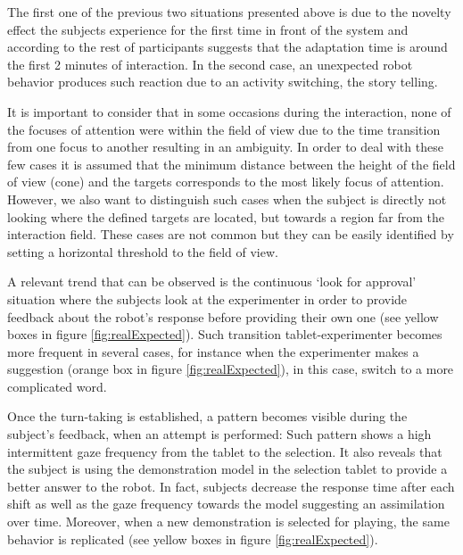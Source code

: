 \documentclass{sig-alternate}
\begin{document}
The first one of the previous two situations presented above is due to the
novelty effect the subjects experience for the first time in front of the system
and according to the rest of participants suggests that the adaptation time is
around the first 2 minutes of interaction. In the second case, an unexpected
robot behavior produces such reaction due to an activity switching, the story
telling.

It is important to consider that in some occasions during the interaction, none
of the focuses of attention were within the field of view due to the time
transition from one focus to another resulting in an ambiguity. In order to deal
with these few cases it is assumed that the minimum distance between the height
of the field of view (cone) and the targets corresponds to the most likely focus
of attention. However, we also want to distinguish such cases when the subject
is directly not looking where the defined targets are located, but towards a
region far from the interaction field. These cases are not common but they can
be easily identified by setting a horizontal threshold to the field of view.

A relevant trend that can be observed is the continuous `look for approval'
situation where the subjects look at the experimenter in order to provide
feedback about the robot's response before providing their own one (see yellow
boxes in figure \ref{fig:realExpected}). Such transition tablet-experimenter
becomes more frequent in several cases, for instance when the experimenter makes
a suggestion (orange box in figure \ref{fig:realExpected}), in this case, switch
to a more complicated word.

Once the turn-taking is established, a pattern becomes visible during the
subject's feedback, when an attempt is performed: Such pattern shows a high
intermittent gaze frequency from the tablet to the selection. It also reveals
that the subject is using the demonstration model in the selection tablet to
provide a better answer to the robot. In fact, subjects decrease the response
time after each shift as well as the gaze frequency towards the model suggesting
an assimilation over time. Moreover, when a new demonstration is selected for
playing, the same behavior is replicated (see yellow boxes in figure
\ref{fig:realExpected}).
\end{document}

